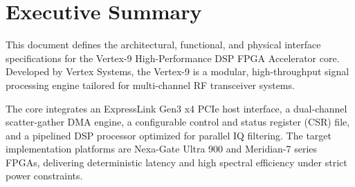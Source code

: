 \section{Executive Summary}
This document defines the architectural, functional, and physical interface specifications for the Vertex-9 High-Performance DSP FPGA Accelerator core. Developed by Vertex Systems, the Vertex-9 is a modular, high-throughput signal processing engine tailored for multi-channel RF transceiver systems. 

The core integrates an ExpressLink Gen3 x4 PCIe host interface, a dual-channel scatter-gather DMA engine, a configurable control and status register (CSR) file, and a pipelined DSP processor optimized for parallel IQ filtering. The target implementation platforms are Nexa-Gate Ultra 900 and Meridian-7 series FPGAs, delivering deterministic latency and high spectral efficiency under strict power constraints.

